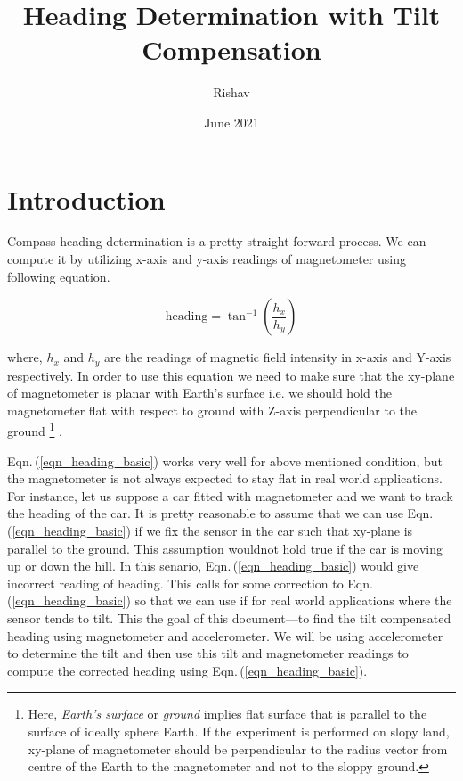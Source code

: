 \documentclass[12pt, a4paper]{article}
\begin{document}
\title{Heading Determination with Tilt Compensation}
\author{Rishav}
\date{June 2021}
\maketitle
\tableofcontents

\newpage
\section{Introduction}
Compass heading determination is a pretty straight forward process. We can compute it by utilizing x-axis and y-axis readings of magnetometer using following equation.

\begin{equation}
    \text{heading} = \tan^{-1}\left(\frac{h_{x}}{h_{y}}\right)
    \label{eqn_heading_basic}
\end{equation}

where, $h_{x}$ and $h_{y}$ are the readings of magnetic field intensity in  x-axis and Y-axis respectively. In order to use this equation we need to make sure that the xy-plane of magnetometer is planar with Earth's surface i.e. we should hold the magnetometer flat with respect to ground  with Z-axis perpendicular to the ground \footnote{Here, \textit{Earth's surface} or \textit{ground} implies flat surface that is parallel to the surface of ideally sphere Earth. If the experiment is performed on slopy land, xy-plane of magnetometer should be perpendicular to the radius vector from centre of the Earth to the magnetometer and not to the sloppy ground.} \cite{honeywell}. \medskip

Eqn.\,(\ref{eqn_heading_basic}) works very well for above mentioned condition, but the magnetometer is not always expected to stay flat in real world applications. For instance, let us suppose a car fitted with magnetometer and we want to track the heading of the car. It is pretty reasonable to assume that we can use Eqn.\,(\ref{eqn_heading_basic}) if we fix the sensor in the car such that xy-plane is parallel to the ground. This assumption wouldnot hold true if the car is moving up or down the hill. In this senario, Eqn.\,(\ref{eqn_heading_basic}) would give incorrect reading of heading. This calls for some correction to Eqn.\,(\ref{eqn_heading_basic}) so that we can use if for real world applications where the sensor tends to tilt. This the goal of this document---to find the tilt compensated heading using magnetometer and accelerometer. We will be using accelerometer to determine the tilt and then use this tilt and magnetometer readings to compute the corrected heading using Eqn.\,(\ref{eqn_heading_basic}). \medskip
\end{document}
